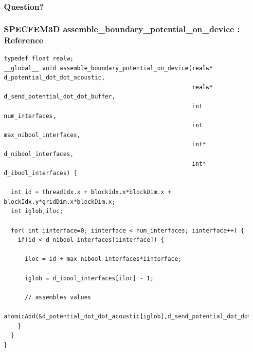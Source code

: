 \documentclass{beamer}
\begin{document}
\appendix

\setcounter{finalframe}{\value{framenumber}}

\begin{frame}
  \frametitle{Question?}
\end{frame}



\begin{frame}[fragile]
\frametitle{SPECFEM3D assemble\_boundary\_potential\_on\_device : Reference}
\tiny
\lstset{style=C}
\begin{lstlisting}
typedef float realw;
__global__ void assemble_boundary_potential_on_device(realw* d_potential_dot_dot_acoustic,
                                                      realw* d_send_potential_dot_dot_buffer,
                                                      int num_interfaces,
                                                      int max_nibool_interfaces,
                                                      int* d_nibool_interfaces,
                                                      int* d_ibool_interfaces) {

  int id = threadIdx.x + blockIdx.x*blockDim.x + blockIdx.y*gridDim.x*blockDim.x;
  int iglob,iloc;

  for( int iinterface=0; iinterface < num_interfaces; iinterface++) {
    if(id < d_nibool_interfaces[iinterface]) {

      iloc = id + max_nibool_interfaces*iinterface;

      iglob = d_ibool_interfaces[iloc] - 1;

      // assembles values
      atomicAdd(&d_potential_dot_dot_acoustic[iglob],d_send_potential_dot_dot_buffer[iloc]);
    }
  }
}
\end{lstlisting}

\end{frame}
\end{document}
